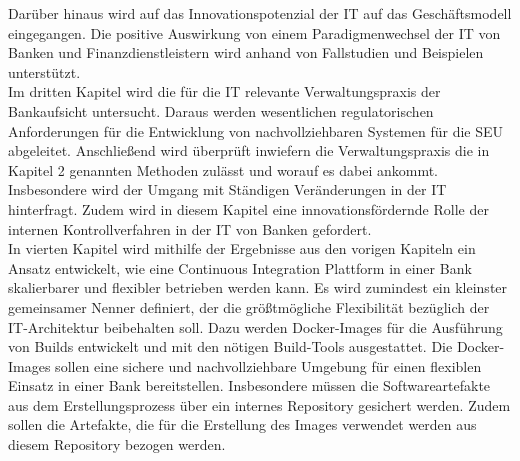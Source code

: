 Darüber hinaus wird auf das Innovationspotenzial der IT auf das Geschäftsmodell eingegangen. Die positive Auswirkung von einem Paradigmenwechsel der IT von Banken und Finanzdienstleistern wird anhand von Fallstudien und Beispielen unterstützt.
\medskip
\\
Im dritten Kapitel wird die für die IT relevante Verwaltungspraxis der Bankaufsicht untersucht. Daraus werden wesentlichen regulatorischen Anforderungen für die Entwicklung von nachvollziehbaren Systemen für die \ac{SEU} abgeleitet. Anschließend wird überprüft inwiefern die Verwaltungspraxis die in Kapitel 2 genannten Methoden zulässt und worauf es dabei ankommt. Insbesondere wird der Umgang mit Ständigen Veränderungen in der IT hinterfragt. Zudem wird in diesem Kapitel eine innovationsfördernde Rolle der internen Kontrollverfahren in der IT von Banken gefordert.
\medskip
\\
In vierten Kapitel wird mithilfe der Ergebnisse aus den vorigen Kapiteln ein Ansatz entwickelt, wie eine Continuous Integration Plattform in einer Bank skalierbarer und flexibler betrieben werden kann. Es wird zumindest ein kleinster gemeinsamer Nenner definiert, der die größtmögliche Flexibilität bezüglich der IT-Architektur beibehalten soll. Dazu werden Docker-Images für die Ausführung von Builds entwickelt und mit den nötigen Build-Tools ausgestattet. Die Docker-Images sollen eine sichere und nachvollziehbare Umgebung für einen flexiblen Einsatz in einer Bank bereitstellen. Insbesondere müssen die Softwareartefakte aus dem Erstellungsprozess über ein internes Repository gesichert werden. Zudem sollen die Artefakte, die für die Erstellung des Images verwendet werden aus diesem Repository bezogen werden. 